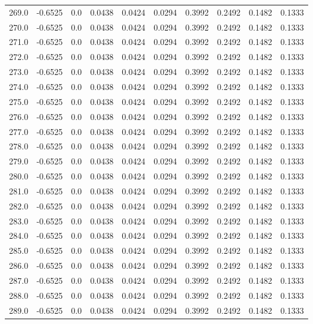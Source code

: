 \begin{longtable}{lrrrrrrrrr}
269.0 & -0.6525 & 0.0 & 0.0438 & 0.0424 & 0.0294 & 0.3992 & 0.2492 & 0.1482 & 0.1333 \\
270.0 & -0.6525 & 0.0 & 0.0438 & 0.0424 & 0.0294 & 0.3992 & 0.2492 & 0.1482 & 0.1333 \\
271.0 & -0.6525 & 0.0 & 0.0438 & 0.0424 & 0.0294 & 0.3992 & 0.2492 & 0.1482 & 0.1333 \\
272.0 & -0.6525 & 0.0 & 0.0438 & 0.0424 & 0.0294 & 0.3992 & 0.2492 & 0.1482 & 0.1333 \\
273.0 & -0.6525 & 0.0 & 0.0438 & 0.0424 & 0.0294 & 0.3992 & 0.2492 & 0.1482 & 0.1333 \\
274.0 & -0.6525 & 0.0 & 0.0438 & 0.0424 & 0.0294 & 0.3992 & 0.2492 & 0.1482 & 0.1333 \\
275.0 & -0.6525 & 0.0 & 0.0438 & 0.0424 & 0.0294 & 0.3992 & 0.2492 & 0.1482 & 0.1333 \\
276.0 & -0.6525 & 0.0 & 0.0438 & 0.0424 & 0.0294 & 0.3992 & 0.2492 & 0.1482 & 0.1333 \\
277.0 & -0.6525 & 0.0 & 0.0438 & 0.0424 & 0.0294 & 0.3992 & 0.2492 & 0.1482 & 0.1333 \\
278.0 & -0.6525 & 0.0 & 0.0438 & 0.0424 & 0.0294 & 0.3992 & 0.2492 & 0.1482 & 0.1333 \\
279.0 & -0.6525 & 0.0 & 0.0438 & 0.0424 & 0.0294 & 0.3992 & 0.2492 & 0.1482 & 0.1333 \\
280.0 & -0.6525 & 0.0 & 0.0438 & 0.0424 & 0.0294 & 0.3992 & 0.2492 & 0.1482 & 0.1333 \\
281.0 & -0.6525 & 0.0 & 0.0438 & 0.0424 & 0.0294 & 0.3992 & 0.2492 & 0.1482 & 0.1333 \\
282.0 & -0.6525 & 0.0 & 0.0438 & 0.0424 & 0.0294 & 0.3992 & 0.2492 & 0.1482 & 0.1333 \\
283.0 & -0.6525 & 0.0 & 0.0438 & 0.0424 & 0.0294 & 0.3992 & 0.2492 & 0.1482 & 0.1333 \\
284.0 & -0.6525 & 0.0 & 0.0438 & 0.0424 & 0.0294 & 0.3992 & 0.2492 & 0.1482 & 0.1333 \\
285.0 & -0.6525 & 0.0 & 0.0438 & 0.0424 & 0.0294 & 0.3992 & 0.2492 & 0.1482 & 0.1333 \\
286.0 & -0.6525 & 0.0 & 0.0438 & 0.0424 & 0.0294 & 0.3992 & 0.2492 & 0.1482 & 0.1333 \\
287.0 & -0.6525 & 0.0 & 0.0438 & 0.0424 & 0.0294 & 0.3992 & 0.2492 & 0.1482 & 0.1333 \\
288.0 & -0.6525 & 0.0 & 0.0438 & 0.0424 & 0.0294 & 0.3992 & 0.2492 & 0.1482 & 0.1333 \\
289.0 & -0.6525 & 0.0 & 0.0438 & 0.0424 & 0.0294 & 0.3992 & 0.2492 & 0.1482 & 0.1333 \\

\end{longtable}
